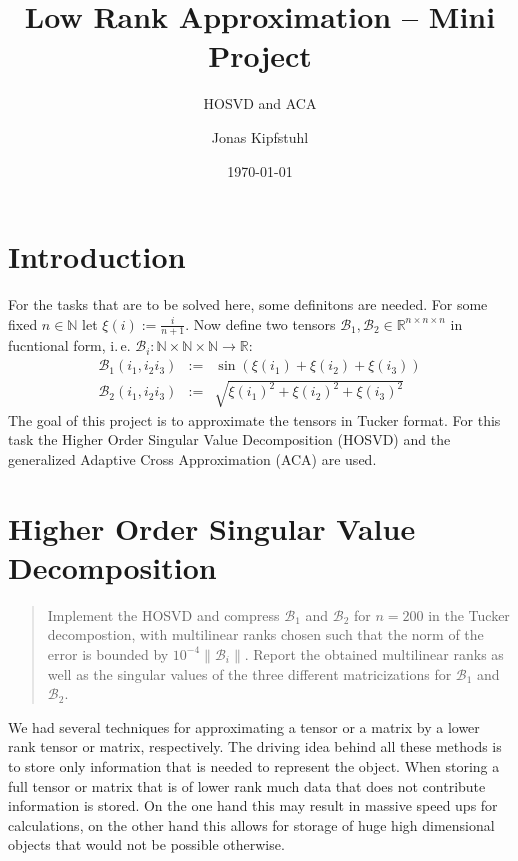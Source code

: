 \documentclass[%
a4paper,
parskip=half,
DIV=calc,
]
{scrartcl}
\title{Low Rank Approximation -- Mini Project}
\subtitle{HOSVD and ACA}
\author{Jonas Kipfstuhl}
\date{\today}
\begin{document}
\maketitle

\section*{Introduction}
\label{sec:intro}
For the tasks that are to be solved here, some definitons are
needed. For some fixed $n \in \mathbb{N}$ let
$\xi(i) := \frac{i}{n+1}$. Now define two tensors
$\mathcal{B}_1, \mathcal{B}_2 \in \mathbb{R}^{n \times n \times n}$ in
fucntional form, i.\,e.
$\mathcal{B}_i: \mathbb{N} \times \mathbb{N} \times \mathbb{N}
\rightarrow \mathbb{R}$:
\begin{align*}
  \mathcal{B}_1 \left(i_1, i_2 i_3 \right) &:=& \sin\left(\xi(i_1) + \xi(i_2) + \xi(i_3)\right) \\
  \mathcal{B}_2 \left(i_1, i_2 i_3 \right) &:=& \sqrt{\xi(i_1)^2 + \xi(i_2)^2 + \xi(i_3)^2}
\end{align*}
The goal of this project is to approximate the tensors in Tucker
format.  For this task the Higher Order Singular Value Decomposition
(HOSVD) and the generalized Adaptive Cross Approximation (ACA) are
used.


\section{Higher Order Singular Value Decomposition}
\label{sec:ex1}
\begin{quote}
  Implement the HOSVD and compress $\mathcal{B}_1$ and
  $\mathcal{B }_2$ for $n = 200$ in the Tucker decompostion, with
  multilinear ranks chosen such that the norm of the error is bounded
  by $10^{−4} \|\mathcal{B}_i\|$.  Report the obtained multilinear
  ranks as well as the singular values of the three different
  matricizations for $\mathcal{B}_1$ and $\mathcal{B}_2$.
\end{quote}

We had several techniques for approximating a tensor or a matrix by a
lower rank tensor or matrix, respectively.  The driving idea behind
all these methods is to store only information that is needed to
represent the object.  When storing a full tensor or matrix that is of
lower rank much data that does not contribute information is stored.
On the one hand this may result in massive speed ups for calculations,
on the other hand this allows for storage of huge high dimensional
objects that would not be possible otherwise.
\end{document}
